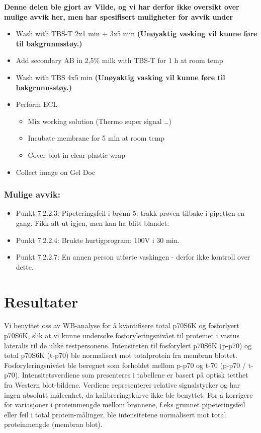 \documentclass[
  letterpaper,
  DIV=11,
  numbers=noendperiod]{scrreprt}
\providecommand{\tightlist}{%
  \setlength{\itemsep}{0pt}\setlength{\parskip}{0pt}}\usepackage{longtable,booktabs,array}
\begin{document}
\textbf{Denne delen ble gjort av Vilde, og vi har derfor ikke oversikt
over mulige avvik her, men har spesifisert muligheter for avvik under}

\begin{itemize}
\tightlist
\item
  Wash with TBS-T 2x1 min + 3x5 min \textbf{(Unøyaktig vasking vil kunne
  føre til bakgrunnsstøy.)}
\item
  Add secondary AB in 2,5\% milk with TBS-T for 1 h at room temp
\item
  Wash with TBS 4x5 min \textbf{(Unøyaktig vasking vil kunne føre til
  bakgrunnsstøy.)}
\item
  Perform ECL

  \begin{itemize}
  \tightlist
  \item
    Mix working solution (Thermo super signal \ldots)
  \item
    Incubate membrane for 5 min at room temp
  \item
    Cover blot in clear plastic wrap
  \end{itemize}
\item
  Collect image on Gel Doc
\end{itemize}

\subsubsection{Mulige avvik:}\label{mulige-avvik-1}

\begin{itemize}
\tightlist
\item
  Punkt 7.2.2.3: Pipeteringsfeil i brønn 5: trakk prøven tilbake i
  pipetten en gang. Fikk alt ut igjen, men kan ha blitt blandet.
\item
  Punkt 7.2.2.4: Brukte hurtigprogram: 100V i 30 min.
\item
  Punkt 7.2.2.7: En annen person utførte vaskingen - derfor ikke
  kontroll over dette.
\end{itemize}

\section{Resultater}\label{resultater-1}

Vi benyttet oss av WB-analyse for å kvantifisere total p70S6K og
fosforlyert p70S6K, slik at vi kunne undersøke fosforyleringsnivået til
proteinet i vastus lateralis til de ulike testpersonene. Intensiteten
til fosforylert p70S6K (p-p70) og total p70S6K (t-p70) ble normalisert
mot totalprotein fra membran blottet. Fosforyleringsnivået ble beregnet
som forholdet mellom p-p70 og t-70 (p-p70 / t-p70). Intensitetsverdiene
som presenteres i tabellene er basert på optisk tetthet fra Western
blot-bildene. Verdiene representerer relative signalstyrker og har ingen
absolutt måleenhet, da kalibreringskurve ikke ble benyttet. For å
korrigere for variasjoner i proteinmengde mellom brønnene, f.eks grunnet
pipeteringsfeil eller feil i total protein-målinger, ble intensitetene
normalisert mot total proteinmengde (membran blot).
\end{document}

